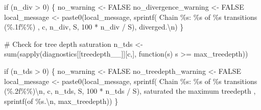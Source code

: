 \documentclass[
  letterpaper,
  DIV=11,
  numbers=noendperiod]{scrartcl}
\newenvironment{Shaded}{\begin{snugshade}}{\end{snugshade}}
\newcommand{\BuiltInTok}[1]{\textcolor[rgb]{0.00,0.23,0.31}{#1}}
\newcommand{\CharTok}[1]{\textcolor[rgb]{0.13,0.47,0.30}{#1}}
\newcommand{\CommentTok}[1]{\textcolor[rgb]{0.37,0.37,0.37}{#1}}
\newcommand{\ControlFlowTok}[1]{\textcolor[rgb]{0.00,0.23,0.31}{#1}}
\newcommand{\DecValTok}[1]{\textcolor[rgb]{0.68,0.00,0.00}{#1}}
\newcommand{\NormalTok}[1]{\textcolor[rgb]{0.00,0.23,0.31}{#1}}
\newcommand{\OperatorTok}[1]{\textcolor[rgb]{0.37,0.37,0.37}{#1}}
\newcommand{\SpecialCharTok}[1]{\textcolor[rgb]{0.37,0.37,0.37}{#1}}
\newcommand{\StringTok}[1]{\textcolor[rgb]{0.13,0.47,0.30}{#1}}
\begin{document}
\begin{Shaded}
\begin{Highlighting}[]
    \ControlFlowTok{if}\NormalTok{ (n\_div }\OperatorTok{\textgreater{}} \DecValTok{0}\NormalTok{) \{}
\NormalTok{      no\_warning }\OperatorTok{\textless{}{-}}\NormalTok{ FALSE}
\NormalTok{      no\_divergence\_warning }\OperatorTok{\textless{}{-}}\NormalTok{ FALSE}
\NormalTok{      local\_message }\OperatorTok{\textless{}{-}} 
\NormalTok{        paste0(local\_message,}
\NormalTok{               sprintf(}\StringTok{\textquotesingle{}  Chain }\SpecialCharTok{\%s}\StringTok{: }\SpecialCharTok{\%s}\StringTok{ of }\SpecialCharTok{\%s}\StringTok{ transitions (}\SpecialCharTok{\%.1f\%\%}\StringTok{) \textquotesingle{}}\NormalTok{, }
\NormalTok{                       c, n\_div, S, }\DecValTok{100} \OperatorTok{*}\NormalTok{ n\_div }\OperatorTok{/}\NormalTok{ S),}
               \StringTok{\textquotesingle{}diverged.}\CharTok{\textbackslash{}n}\StringTok{\textquotesingle{}}\NormalTok{)}
\NormalTok{    \}}
    
    \CommentTok{\# Check for tree depth saturation}
\NormalTok{    n\_tds }\OperatorTok{\textless{}{-}} \BuiltInTok{sum}\NormalTok{(sapply(diagnostics[[}\StringTok{\textquotesingle{}treedepth\_\_\textquotesingle{}}\NormalTok{]][c,], }
\NormalTok{                        function(s) s }\OperatorTok{\textgreater{}=}\NormalTok{ max\_treedepth))}
    
    \ControlFlowTok{if}\NormalTok{ (n\_tds }\OperatorTok{\textgreater{}} \DecValTok{0}\NormalTok{) \{}
\NormalTok{      no\_warning }\OperatorTok{\textless{}{-}}\NormalTok{ FALSE}
\NormalTok{      no\_treedepth\_warning }\OperatorTok{\textless{}{-}}\NormalTok{ FALSE}
\NormalTok{      local\_message }\OperatorTok{\textless{}{-}} 
\NormalTok{        paste0(local\_message,}
\NormalTok{               sprintf(}\StringTok{\textquotesingle{}  Chain }\SpecialCharTok{\%s}\StringTok{: }\SpecialCharTok{\%s}\StringTok{ of }\SpecialCharTok{\%s}\StringTok{ transitions (}\SpecialCharTok{\%.2f\%\%}\StringTok{)}\CharTok{\textbackslash{}n}\StringTok{\textquotesingle{}}\NormalTok{,}
\NormalTok{                       c, n\_tds, S, }\DecValTok{100} \OperatorTok{*}\NormalTok{ n\_tds }\OperatorTok{/}\NormalTok{ S),}
                       \StringTok{\textquotesingle{}           saturated the maximum treedepth \textquotesingle{}}\NormalTok{,}
\NormalTok{               sprintf(}\StringTok{\textquotesingle{}of }\SpecialCharTok{\%s}\StringTok{.}\CharTok{\textbackslash{}n}\StringTok{\textquotesingle{}}\NormalTok{, max\_treedepth))}
\NormalTok{    \}}
    

\end{Highlighting}
\end{Shaded}
\end{document}
